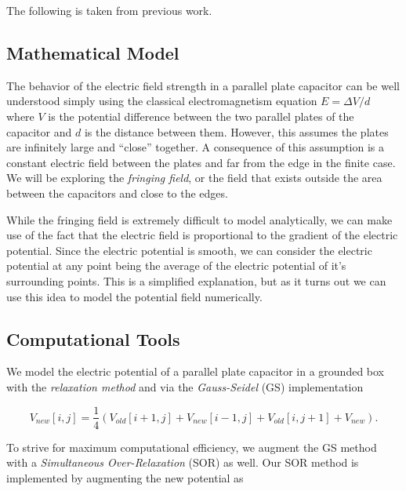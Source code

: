 \documentclass{report}
\begin{document}
            The following is taken from previous work\cite{fringingfieldsBealeChapman2019}.

        \subsection{Mathematical Model}

            The behavior of the electric field strength in a parallel plate capacitor can be well understood simply using the classical electromagnetism equation $E = \Delta V / d$ where $V$ is the potential difference between the two parallel plates of the capacitor and $d$ is the distance between them. However, this assumes the plates are infinitely large and ``close'' together.  A consequence of this assumption is a constant electric field between the plates and far from the edge in the finite case. We will be exploring the \emph{fringing field}, or the field that exists outside the area between the capacitors and close to the edges.

            While the fringing field is extremely difficult to model analytically, we can make use of the fact that the electric field is proportional to the gradient of the electric potential.  Since the electric potential is smooth, we can consider the electric potential at any point being the average of the electric potential of it's surrounding points. This is a simplified explanation, but as it turns out we can use this idea to model the potential field numerically.

        \subsection{Computational Tools}

            We model the electric potential of a parallel plate capacitor in a grounded box with the \emph{relaxation method} and via the \emph{Gauss-Seidel} (GS) implementation
        
            \begin{equation} \label{eq:GS}
                V_{new}[i,j]=\frac{1}{4}(V_{old}[i+1,j] +V_{new}[i-1,j]+V_{old}[i,j+1]+V_{new}).
            \end{equation}
            
            To strive for maximum computational efficiency, we augment the GS method with a \emph{Simultaneous Over-Relaxation} (SOR) as well. Our SOR method is implemented by augmenting the new potential as 
            
\end{document}
